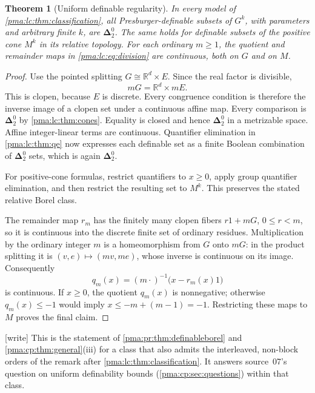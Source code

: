 \documentclass[11pt]{article}
\numberwithin{equation}{section}
\newtheorem{theorem}{Theorem}[section]
\theoremstyle{definition}
\theoremstyle{remark}
\newcommand{\R}{\mathbb R}
\newcommand{\Dtwo}{\boldsymbol{\Delta}^{0}_{2}}
\newcommand{\writetag}{\textup{\textsf{\small[write]}}}
\begin{document}
\begin{theorem}[Uniform definable regularity]\label{pma:lc:thm:definable}
In every model of \cref{pma:lc:thm:classification}, all Presburger-definable
subsets of $G^k$, with parameters and arbitrary finite $k$, are $\Dtwo$.
The same holds for definable subsets of the positive cone $M^k$ in its
relative topology. For each ordinary $m\ge1$, the quotient and remainder
maps in \eqref{pma:lc:eq:division} are continuous, both on $G$ and on $M$.
\end{theorem}
\begin{proof}
Use the pointed splitting $G\cong\R^d\times E$. Since the real factor
is divisible,
\[
 mG=\R^d\times mE.
\]
This is clopen, because $E$ is discrete. Every congruence condition is
therefore the inverse image of a clopen set under a continuous affine
map. Every comparison is $\Dtwo$ by \cref{pma:lc:thm:cones}. Equality is
closed and hence $\Dtwo$ in a metrizable space. Affine integer-linear
terms are continuous. Quantifier elimination in \cref{pma:lc:thm:qe} now
expresses each definable set as a finite Boolean combination of
$\Dtwo$ sets, which is again $\Dtwo$.

For positive-cone formulas, restrict quantifiers to $x\ge0$, apply group
quantifier elimination, and then restrict the resulting set to $M^k$.
This preserves the stated relative Borel class.

The remainder map $r_m$ has the finitely many clopen fibers
$r1+mG$, $0\le r<m$, so it is continuous into the discrete finite set
of ordinary residues. Multiplication by the ordinary integer $m$ is a
homeomorphism from $G$ onto $mG$: in the product splitting it is
$(v,e)\mapsto(mv,me)$, whose inverse is continuous on its image.
Consequently
\begin{equation}\label{pma:lc:eq:continuousdivision}
 q_m(x)=(m\cdot)^{-1}\bigl(x-r_m(x)1\bigr)
\end{equation}
is continuous. If $x\ge0$, the quotient $q_m(x)$ is nonnegative;
otherwise $q_m(x)\le-1$ would imply $x\le-m+(m-1)=-1$.
Restricting these maps to $M$ proves the final claim.
\end{proof}

\noindent\writetag{} This is the statement of \cref{pma:pr:thm:definableborel}
and \cref{pma:cp:thm:general}(iii) for a class that also admits the
interleaved, non-block orders of the remark after
\cref{pma:lc:thm:classification}. It answers source~07's question on uniform
definability bounds (\cref{pma:cp:sec:questions}) within that class.
\end{document}
